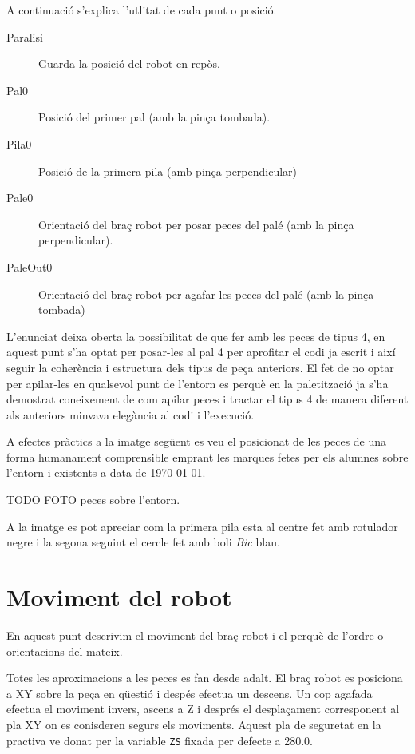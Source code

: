 A continuació s'explica l'utlitat de cada punt o posició.

\begin{description}
 \item [Paralisi] Guarda la posició del robot en repòs.
 \item [Pal0] Posició del primer pal (amb la pinça tombada).
 \item [Pila0] Posició de la primera pila (amb pinça perpendicular)
 \item [Pale0] Orientació del braç robot per posar peces del palé (amb la pinça
perpendicular).
 \item [PaleOut0] Orientació del braç robot per agafar les peces del palé
(amb la pinça tombada) 
\end{description}

L'enunciat deixa oberta la possibilitat de que fer amb les peces de
tipus 4, en aquest punt s'ha optat per posar-les al pal 4 per aprofitar el codi ja escrit i
així seguir la coherència i estructura dels tipus de peça anteriors. El fet de
no optar per apilar-les en qualsevol punt de l'entorn es perquè en la paletització
ja s'ha demostrat coneixement de com apilar peces i tractar el tipus 4 de manera
diferent als anteriors minvava elegància al codi i l'execució.

A efectes pràctics a la imatge següent es veu el posicionat de les peces de una forma
humanament comprensible emprant les marques fetes per els alumnes sobre l'entorn i existents
a data de \today. 

TODO FOTO peces sobre l'entorn.

A la imatge es pot apreciar com la primera pila esta al centre fet amb
rotulador negre i la segona seguint el cercle fet amb boli \emph{Bic} blau.

\section{Moviment del robot}
En aquest punt descrivim el moviment del braç robot i el perquè de l'ordre o
orientacions del mateix.

Totes les aproximacions a les peces es fan desde adalt. El braç robot es posiciona
a XY sobre la peça en qüestió i despés efectua un descens. Un cop agafada
efectua el moviment invers, ascens a Z i després el desplaçament corresponent
al pla XY on es conisderen segurs els moviments. Aquest pla de seguretat
en la practiva ve donat per la variable \texttt{ZS} fixada per defecte
a 280.0.

